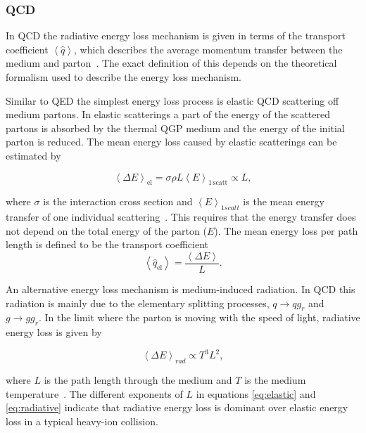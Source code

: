 \subsubsection*{QCD}
In QCD the radiative energy loss mechanism is given in terms of the transport coefficient $\left<\hat q\right>$, which describes the average momentum transfer between the medium and parton~\cite{jetBroadeningPpb1}. The exact definition of this depends on the theoretical formalism used to describe the energy loss mechanism. 

Similar to QED the simplest energy loss process is elastic QCD scattering off medium partons. In elastic scatterings a part of the energy of the scattered partons is absorbed by the thermal QGP medium and the energy of the initial parton is reduced. The mean energy loss caused by elastic scatterings can be estimated by

\begin{equation}
\left<\Delta E\right>_{\mathrm{el}}=\sigma \rho L \left<E\right>_{\mathrm{1\,scatt}}\propto L,
\label{eq:elastic}
\end{equation}

\noindent where $\sigma$ is the interaction cross section and $\left<E\right>_{1 scatt}$ is the mean energy transfer of one individual scattering~\cite{Majumder:2010qh}. This requires that the energy transfer does not depend on the total energy of the parton ($E$). The mean energy loss per path length is defined to be the transport coefficient \begin{equation}
\left< \hat q_\mathrm{el}\right> = \frac{\left< \Delta E\right>}{L}.
\end{equation}

\noindent An alternative energy loss mechanism is medium-induced radiation. In QCD this radiation is mainly due to the elementary splitting processes, $q\rightarrow qg_r$ and $g\rightarrow gg_r$. In the limit where the parton is moving with the speed of light, radiative energy loss is given by

\begin{equation}
\left<\Delta E\right>_{rad}\propto T^3L^2,
\label{eq:radiative}
\end{equation}

\noindent where $L$ is the path length through the medium and $T$ is the medium temperature~\cite{Dominguez:2008vd}. The different exponents of $L$ in equations \ref{eq:elastic} and \ref{eq:radiative} indicate that radiative energy loss is dominant over elastic energy loss in a typical heavy-ion collision.

